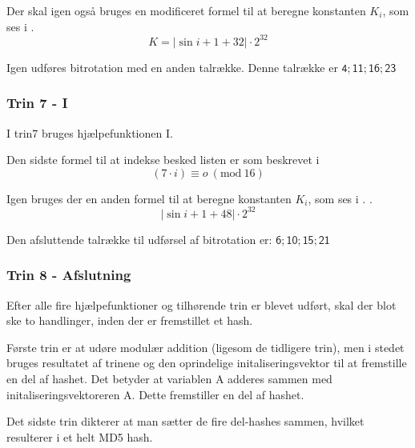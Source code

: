 \documentclass[12pt]{article}
\newcommand{\Mod}[1]{\ (\mathrm{mod}\ #1)}
\begin{document}
Der skal igen også bruges en modificeret formel til at beregne konstanten $K_i$, som ses i  \equationautorefname{~\ref{step-6-2}}\footnotemark[5].
\begin{equation}\label{step-6-2}
K=| \sin{i+1+32} | \cdot 2^{32}
\end{equation}


Igen udføres bitrotation med en anden talrække. Denne talrække er $\mathsf{4;11;16;23}$

\subsubsection{Trin 7 - I}
I trin7 bruges hjælpefunktionen I. 

Den sidste formel til at indekse besked listen er som beskrevet i \equationautorefname{~\ref{step-7}}
\begin{equation}\label{step-7}
(7\cdot i) \equiv o \Mod{16}
\end{equation}

Igen bruges der en anden formel til at beregne konstanten $K_i$, som ses i \footnotemark[5]. \equationautorefname{~\ref{step-7-2}}.
\begin{equation}\label{step-7-2}
| \sin{i+1+48} | \cdot 2^{32}
\end{equation}

Den afsluttende talrække til udførsel af bitrotation er: $\mathsf{6;10;15;21}$

\subsubsection{Trin 8 - Afslutning}
Efter alle fire hjælpefunktioner og tilhørende trin er blevet udført, skal der blot ske to handlinger, inden der er fremstillet et hash. 

Første trin er at udøre modulær addition (ligesom de tidligere trin), men i stedet bruges resultatet af trinene og den oprindelige initaliseringsvektor til at fremstille en del af hashet. Det betyder at variablen A adderes sammen med initaliseringsvektoreren A. Dette fremstiller en del af hashet.

Det sidste trin dikterer at man sætter de fire del-hashes sammen, hvilket resulterer i et helt MD5 hash. 
\end{document}
